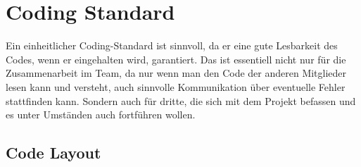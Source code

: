 \section{Coding Standard}
Ein einheitlicher Coding-Standard ist sinnvoll, da er eine gute Lesbarkeit des Codes, wenn er eingehalten wird, garantiert. Das ist essentiell nicht nur für die Zusammenarbeit im Team, da nur wenn man den Code der anderen Mitglieder lesen kann und versteht, auch sinnvolle Kommunikation über eventuelle Fehler stattfinden kann. Sondern auch für dritte, die sich mit dem Projekt befassen und es unter Umständen auch fortführen wollen.

\subsection{Code Layout}

